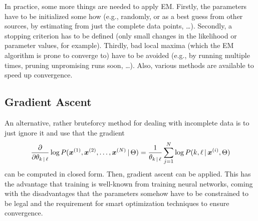 			In practice, some more things are needed to apply EM. Firstly, the parameters have to be initialized some how (e.g., randomly, or as a best guess from other sources, by estimating from just the complete data points, \dots). Secondly, a stopping criterion has to be defined (only small changes in the likelihood or parameter values, for example). Thirdly, bad local maxima (which the EM algorithm is prone to converge to) have to be avoided (e.g., by running multiple times, pruning unpromising runs soon, \dots). Also, various methods are available to speed up convergence.

		\subsection{Gradient Ascent}
			An alternative, rather bruteforcy method for dealing with incomplete data is to just ignore it and use that the gradient
			\begin{equation}
				\pdv{\theta_{k \,\vert\,\ell}} \log P(\bm{x}^{(1)}, \bm{x}^{(2)}, \dots, \bm{x}^{(N)} \,\vert\, \Theta)
				=
				\frac{1}{\theta_{k \,\vert\, \ell}} \sum_{j = 1}^{N} \log P(k, \ell \,\vert\, \bm{x}^{(i)}, \Theta)
			\end{equation}
			can be computed in closed form. Then, gradient ascent can be applied. This has the advantage that training is well-known from training neural networks, coming with the disadvantages that the parameters somehow have to be constrained to be legal and the requirement for smart optimization techniques to ensure convergence.


